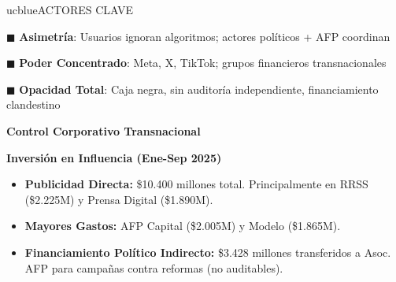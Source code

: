 \begin{sectionbox}{ucblue}{ACTORES CLAVE}

{\fontsize{20}{24}\selectfont
\textbf{\textcolor{ucred}{\ensuremath{\blacksquare}}} \textbf{Asimetría}: Usuarios ignoran algoritmos; actores políticos + AFP coordinan

\textbf{\textcolor{ucred}{\ensuremath{\blacksquare}}} \textbf{Poder Concentrado}: Meta, X, TikTok; grupos financieros transnacionales

\textbf{\textcolor{ucred}{\ensuremath{\blacksquare}}} \textbf{Opacidad Total}: Caja negra, sin auditoría independiente, financiamiento clandestino

\vspace{0.2cm}
\begin{center}
\textbf{\textcolor{ucblue}{Control Corporativo Transnacional}}
\vspace{0.2cm}

\end{center}

\vspace{0.4cm}
\textbf{\textcolor{ucblue}{Inversión en Influencia (Ene-Sep 2025)}}
\begin{itemize}
    \item \textbf{Publicidad Directa:} \$10.400 millones total. Principalmente en RRSS (\$2.225M) y Prensa Digital (\$1.890M).
    \item \textbf{Mayores Gastos:} AFP Capital (\$2.005M) y Modelo (\$1.865M).
    \item \textbf{Financiamiento Político Indirecto:} \$3.428 millones transferidos a Asoc. AFP para campañas contra reformas (no auditables).
\end{itemize}
}

\end{sectionbox}